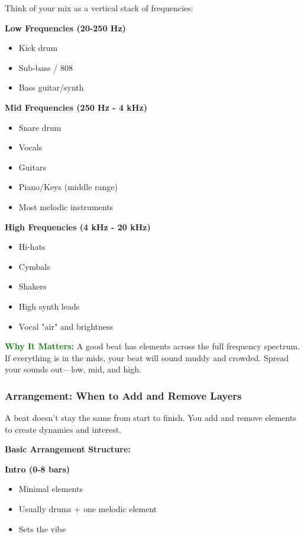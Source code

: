 \documentclass[11pt,letterpaper]{article}
\newcommand{\greentext}[1]{\textcolor{green}{\textbf{#1}}}
\begin{document}
Think of your mix as a vertical stack of frequencies:

\textbf{Low Frequencies (20-250 Hz)}
\begin{itemize}[leftmargin=*]
\item Kick drum
\item Sub-bass / 808
\item Bass guitar/synth
\end{itemize}

\textbf{Mid Frequencies (250 Hz - 4 kHz)}
\begin{itemize}[leftmargin=*]
\item Snare drum
\item Vocals
\item Guitars
\item Piano/Keys (middle range)
\item Most melodic instruments
\end{itemize}

\textbf{High Frequencies (4 kHz - 20 kHz)}
\begin{itemize}[leftmargin=*]
\item Hi-hats
\item Cymbals
\item Shakers
\item High synth leads
\item Vocal "air" and brightness
\end{itemize}

\textbf{\greentext{Why It Matters:}} A good beat has elements across the full frequency spectrum. If everything is in the mids, your beat will sound muddy and crowded. Spread your sounds out—low, mid, and high.

\subsubsection{Arrangement: When to Add and Remove Layers}

A beat doesn't stay the same from start to finish. You add and remove elements to create dynamics and interest.

\textbf{Basic Arrangement Structure:}

\textbf{Intro (0-8 bars)}
\begin{itemize}[leftmargin=*]
\item Minimal elements
\item Usually drums + one melodic element
\item Sets the vibe
\end{itemize}
\end{document}
